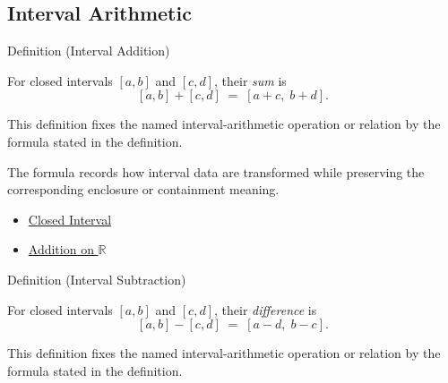 
\subsection{Interval Arithmetic}

\begin{definitionbox}{Definition (Interval Addition)}
\begin{definition}\label{def:interval-add}
For closed intervals $[a,b]$ and $[c,d]$, their \emph{sum} is
\[
  [a,b] + [c,d] \;=\; [a+c,\; b+d].
\]
\end{definition}
\end{definitionbox}

\begin{remark*}
This definition fixes the named interval-arithmetic operation or relation by
the formula stated in the definition.
\end{remark*}

\begin{remark*}[Interpretation]
The formula records how interval data are transformed while preserving the
corresponding enclosure or containment meaning.
\end{remark*}

\begin{dependencies}
\begin{itemize}
  \item \hyperref[def:closed-interval]{Closed Interval}
  \item \hyperref[def:addition-on-r]{Addition on $\mathbb{R}$}
\end{itemize}
\end{dependencies}

\begin{definitionbox}{Definition (Interval Subtraction)}
\begin{definition}\label{def:interval-sub}
For closed intervals $[a,b]$ and $[c,d]$, their \emph{difference} is
\[
  [a,b] - [c,d] \;=\; [a-d,\; b-c].
\]
\end{definition}
\end{definitionbox}

\begin{remark*}
This definition fixes the named interval-arithmetic operation or relation by
the formula stated in the definition.
\end{remark*}

